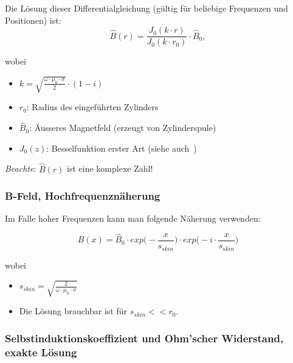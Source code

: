 Die L\"osung dieser Differentialgleichung (g\"ultig f\"ur beliebige Frequenzen und Positionen) ist:
\begin{equation}
    \label{eq:vollzylinder:bFeldExact}
    \hat{B} (r) = \frac{J_0 (k \cdot r)}{J_0 (k \cdot r_0)} \cdot \hat{B}_0,
\end{equation}

wobei
\begin{itemize}
    \item[]
        $k = \sqrt{\frac{\omega \cdot \mu_0 \cdot \sigma}{2}} \cdot (1-i)$
    \item[]
        $r_0$: Radius des eingef\"uhrten Zylinders
    \item[]
        $\hat{B}_0$: \"Ausseres Magnetfeld (erzeugt von Zylinderspule)
    \item[]
        $J_0(z)$: Besselfunktion erster Art (siehe auch~\cite{ref:wikipedia:bessel})
\end{itemize}

\emph{Beachte}: $\hat{B} (r)$ ist eine komplexe Zahl!


\subsubsection{B-Feld, Hochfrequenzn\"aherung}
\label{sec:arbgru:subsec:vollzylinder:bFeldapprox}


Im Falle hoher Frequenzen kann man folgende N\"aherung verwenden:

\begin{equation}
    \label{eq:vollzylinder:bFeldApprox}
    \hat{B} (x) = \hat{B}_0 \cdot exp\Biggl(-\frac{x}{s_{skin}} \Biggr) \cdot exp\Biggl(-i \cdot \frac{x}{s_{skin}} \Biggr)
\end{equation}

wobei
\begin{itemize}
    \item[]
        $s_{skin} = \sqrt{\frac{2}{\omega \cdot \mu_0 \cdot \sigma}}$
    \item[]
        Die L\"osung brauchbar ist f\"ur $s_{skin} << r_0$.
\end{itemize}




\subsubsection{Selbstinduktionskoeffizient und Ohm'scher Widerstand, exakte L\"osung}
\label{sec:arbgru:subsec:vollzylinder:LRexakt}

